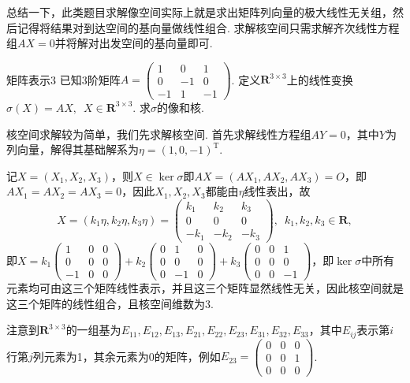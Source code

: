 总结一下，此类题目求解像空间实际上就是求出矩阵列向量的极大线性无关组，然后记得将结果对到达空间的基向量做线性组合. 求解核空间只需求解齐次线性方程组$AX=0$并将解对出发空间的基向量即可.

\begin{example}{}{矩阵表示3}
    已知3阶矩阵$A=\begin{pmatrix}
            1 & 0 & 1 \\ 0 & -1 & 0 \\ -1 & 1 & -1
        \end{pmatrix}$. 定义$\mathbf{R}^{3 \times 3}$上的线性变换$\sigma(X)=AX,\enspace X \in \mathbf{R}^{3 \times 3}$. 求$\sigma$的像和核.
\end{example}

\begin{solution}
    核空间求解较为简单，我们先求解核空间. 首先求解线性方程组$AY=0$，其中$Y$为列向量，解得其基础解系为$\eta=(1,0,-1)^\mathrm{T}$.

    记$X=(X_1,X_2,X_3)$，则$X\in\ker\sigma$即$AX=(AX_1,AX_2,AX_3)=O$，即$AX_1=AX_2=AX_3=0$，因此$X_1,X_2,X_3$都能由$\eta$线性表出，故
    \[X=(k_1\eta,k_2\eta,k_3\eta)=\begin{pmatrix}
            k_1 & k_2 & k_3 \\ 0 & 0 & 0 \\ -k_1 & -k_2 & -k_3
        \end{pmatrix},\enspace k_1,k_2,k_3\in\mathbf{R},\]
    即$X=k_1\begin{pmatrix}
            1 & 0 & 0 \\ 0 & 0 & 0 \\ -1 & 0 & 0
        \end{pmatrix}+k_2\begin{pmatrix}
            0 & 1 & 0 \\ 0 & 0 & 0 \\ 0 & -1 & 0
        \end{pmatrix}+k_3\begin{pmatrix}
            0 & 0 & 1 \\ 0 & 0 & 0 \\ 0 & 0 & -1
        \end{pmatrix}$，即$\ker\sigma$中所有元素均可由这三个矩阵线性表示，并且这三个矩阵显然线性无关，因此核空间就是这三个矩阵的线性组合，且核空间维数为3.

    注意到$\mathbf{R}^{3 \times 3}$的一组基为$E_{11},E_{12},E_{13},E_{21},E_{22},E_{23},E_{31},E_{32},E_{33}$，其中$E_{ij}$表示第$i$行第$j$列元素为1，其余元素为0的矩阵，例如$E_{23}=\begin{pmatrix}
            0 & 0 & 0 \\ 0 & 0 & 1 \\ 0 & 0 & 0
        \end{pmatrix}$.


\end{solution}
